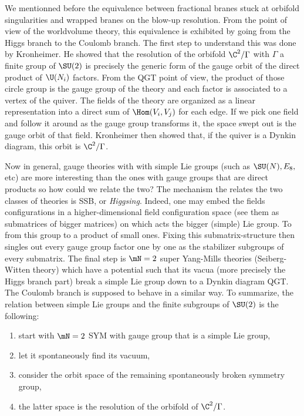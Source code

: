 \documentclass{worksheetclass}
\begin{document}
    We mentionned before the equivalence between fractional branes stuck at orbifold singularities and wrapped branes on the blow-up resolution. From the point of view of the worldvolume theory, this equivalence is exhibited by going from the Higgs branch to the Coulomb branch. The first step to understand this was done by Kronheimer. He showed that the resolution of the orbifold $\C^2/\Gamma$ with $\Gamma$ a finite group of $\SU(2)$ is precisely the generic form of the gauge orbit of the direct product of $\U(N_i)$ factors. From the QGT point of view, the product of those circle group is the gauge group of the theory and each factor is associated to a vertex of the quiver. The fields of the theory are organized as a linear representation into a direct sum of $\Hom(V_i,V_j)$ for each edge. If we pick one field and follow it around as the gauge group transforms it, the space swept out is the gauge orbit of that field. Kronheimer then showed that, if the quiver is a Dynkin diagram, this orbit is $\C^2/\Gamma$. 
    
    Now in general, gauge theories with with simple Lie groups (such as $\SU(N), E_8,$etc) are more interesting than the ones with gauge groups that are direct products so how could we relate the two? The mechanism the relates the two classes of theories is SSB, or \emph{Higgsing}. Indeed, one may embed the fields configurations in a higher-dimensional field configuration space (see them as submatrices of bigger matrices) on which acts the bigger (simple) Lie group. To from this group to a product of small ones. Fixing this submatrix-structure then singles out every gauge group factor one by one as the stabilizer subgroups of every submatrix. The final step is $\mN=2$ super Yang-Mills theories (Seiberg-Witten theory) which have a potential such that its vacua (more precisely the Higgs branch part) break a simple Lie group down to a Dynkin diagram QGT. The Coulomb branch is supposed to behave in a similar way. To summarize, the relation between simple Lie groups and the finite subgroups of $\SU(2)$ is the following:
    \begin{enumerate}
        \item start with $\mN=2$ SYM with gauge group that is a simple Lie group,
        \item let it spontaneously find its vacuum,
        \item consider the orbit space of the remaining spontaneously broken symmetry group,
        \item the latter space is the resolution of the orbifold of $\C^2/\Gamma$.
    \end{enumerate}
\end{document}
